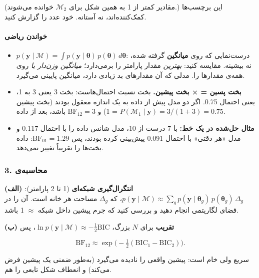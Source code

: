 (مقادیر کمتر از 1 به همین شکل برای \(\mathcal{M}_2\) خوانده می‌شوند.) این
برچسب‌ها کمک‌کننده‌اند، نه آستانه. خود عدد را گزارش کنید.

\paragraph{خواندن ریاضی}

\begin{itemize}
\tightlist
\item
  \(p(\mathbf{y} \mid \mathcal{M}) = \int p(\mathbf{y} \mid \boldsymbol\theta)\,p(\boldsymbol\theta)\,d\boldsymbol\theta\):
  درست‌نمایی که روی  \textbf{میانگین} گرفته شده، نه بیشینه.
  مقایسه کنید:  \emph{بهترین} مقدار پارامتر را برمی‌دارد؛
   \emph{میانگین وزن‌دار با } روی همه‌ی
  مقدارها را. مدلی که  آن مقدارهای بد زیادی دارد، میانگین
  پایینی می‌گیرد.
\item
  \textbf{بخت پسین =  × بخت پیشین.} بخت 
  نسبت احتمال‌هاست: بخت 3 یعنی 3 به 1، یعنی احتمال 0.75. اگر دو مدل پیش
  از داده به یک اندازه معقول بودند (بخت پیشین = 1) و
  \(\mathrm{BF}_{12} = 3\) باشد، بعد از داده
  \(P(\mathcal{M}_1 \mid \mathbf{y}) = 3/(1+3) = 0.75\).
\item
  \textbf{مثال حل‌شده در یک خط:} با 7 درست از 10، مدل شانس داده را با
  احتمال 0.117 و مدل «هر دقتی» با احتمال 0.091 پیش‌بینی کرده بودند، پس
  \(\mathrm{BF}_{01} = 1.29\): داده بخت‌ها را تقریباً تغییر نمی‌دهد.
\end{itemize}

\subsubsection{\texorpdfstring{3. محاسبه‌ی }{3. محاسبه‌ی Bayes factor}}

\textbf{(الف) انتگرال‌گیری شبکه‌ای} (1 تا 2 پارامتر):
\(p(\mathbf{y}\mid\mathcal{M}) \approx \sum_g p(\mathbf{y}\mid\boldsymbol\theta_g)\, p(\boldsymbol\theta_g)\, \Delta_g\)،
که \(\Delta_g\) مساحت هر خانه است. آن را در فضای لگاریتمی
 انجام دهید و بررسی کنید که جرم پیشین داخل شبکه \ensuremath{\approx} 1
باشد.

\textbf{(ب) تقریب } برای \(N\) بزرگ،
\(\ln p(\mathbf{y}\mid\mathcal{M}) \approx -\tfrac12\mathrm{BIC}\)، پس

\[
\mathrm{BF}_{12} \approx \exp\big(-\tfrac12(\mathrm{BIC}_1 - \mathrm{BIC}_2)\big).
\]

سریع ولی خام است: پیشین واقعی را نادیده می‌گیرد (به‌طور ضمنی یک پیشین
 فرض می‌کند) و انعطاف شکل تابعی را هم.

